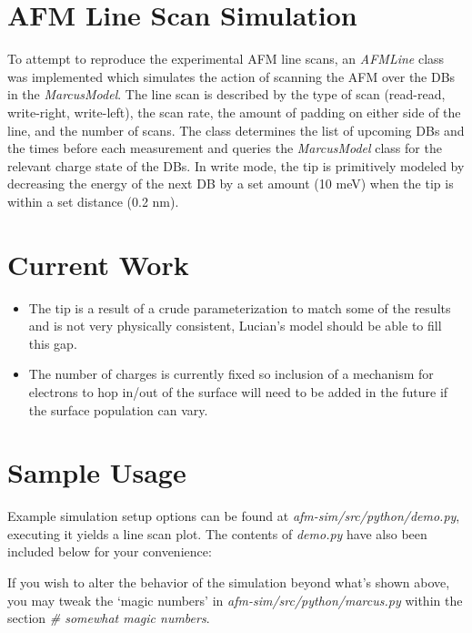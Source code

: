 \documentclass{article}
\begin{document}
\section{AFM Line Scan Simulation} \label{sec:simulation}

To attempt to reproduce the experimental AFM line scans, an \textit{AFMLine} class was implemented which simulates the action of scanning the AFM over the DBs in the \textit{MarcusModel}. The line scan is described by the type of scan (read-read, write-right, write-left), the scan rate, the amount of padding on either side of the line, and the number of scans. The class determines the list of upcoming DBs and the times before each measurement and queries the \textit{MarcusModel} class for the relevant charge state of the DBs. In write mode, the tip is primitively modeled by decreasing the energy of the next DB by a set amount (10 meV) when the tip is within a set distance (0.2 nm).

\section{Current Work}

\begin{itemize}
 \item The tip is a result of a crude parameterization to match some of the results and is not very physically consistent, Lucian's model should be able to fill this gap.
 \item The number of charges is currently fixed so inclusion of a mechanism for electrons to hop in/out of the surface will need to be added in the future if the surface population can vary.
\end{itemize}


\clearpage
\section{Sample Usage}

Example simulation setup options can be found at \textit{afm-sim/src/python/demo.py}, executing it yields a line scan plot. The contents of \textit{demo.py} have also been included below for your convenience:



If you wish to alter the behavior of the simulation beyond what's shown above, you may tweak the `magic numbers' in \textit{afm-sim/src/python/marcus.py} within the section \textit{\# somewhat magic numbers}.
\end{document}
